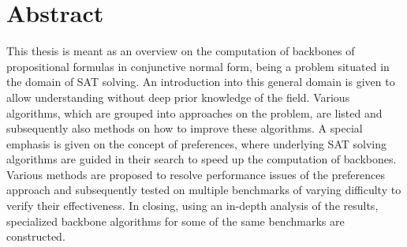 \chapter*{Abstract}
This thesis is meant as an overview on the computation of backbones of propositional formulas in conjunctive normal form, being a problem situated in the domain of SAT solving. An introduction into this general domain is given to allow understanding without deep prior knowledge of the field. Various algorithms, which are grouped into approaches on the problem, are listed and subsequently also methods on how to improve these algorithms. A special emphasis is given on the concept of preferences, where underlying SAT solving algorithms are guided in their search to speed up the computation of backbones. Various methods are proposed to resolve performance issues of the preferences approach and subsequently tested on multiple benchmarks of varying difficulty to verify their effectiveness. In closing, using an in-depth analysis of the results, specialized backbone algorithms for some of the same benchmarks are constructed.